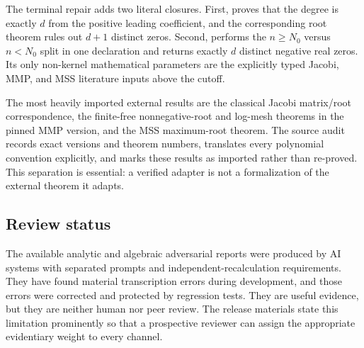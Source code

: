 The terminal repair adds two literal closures.  First,
\allowbreak{}\allowbreak
{} proves that the degree is exactly $d$
from the positive leading coefficient, and the corresponding root theorem
rules out $d+1$ distinct zeros.  Second,
\allowbreak{}\allowbreak
{} performs the
$n\ge N_0$ versus $n<N_0$ split in one declaration and returns exactly $d$
distinct negative real zeros.  Its only non-kernel mathematical parameters
are the explicitly typed Jacobi, MMP, and MSS literature inputs above the
cutoff.

The most heavily imported external results are the classical Jacobi
matrix/root correspondence, the finite-free nonnegative-root and log-mesh
theorems in the pinned MMP version, and the MSS maximum-root theorem.  The
source audit records exact versions and theorem numbers, translates every
polynomial convention explicitly, and marks these results as imported rather
than re-proved.  This separation is essential: a verified adapter is not a
formalization of the external theorem it adapts.

\subsection{Review status}

The available analytic and algebraic adversarial reports were produced by
AI systems with separated prompts and independent-recalculation requirements.
They have found material transcription errors during development, and those
errors were corrected and protected by regression tests.  They are useful
evidence, but they are neither human nor peer review.  The release materials
state this limitation prominently so that a prospective reviewer can assign
the appropriate evidentiary weight to every channel.
